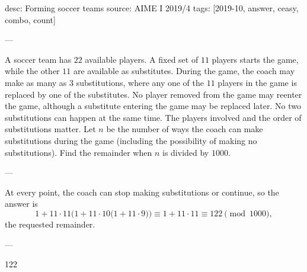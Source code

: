 desc: Forming soccer teams
source: AIME I 2019/4
tags: [2019-10, answer, ceasy, combo, count]

---

A soccer team has $22$ available players. A fixed set of $11$ players starts the game, while the other $11$ are available as substitutes. During the game, the coach may make as many as $3$ substitutions, where any one of the $11$ players in the game is replaced by one of the substitutes. No player removed from the game may reenter the game, although a substitute entering the game may be replaced later. No two substitutions can happen at the same time. The players involved and the order of substitutions matter. Let $n$ be the number of ways the coach can make substitutions during the game (including the possibility of making no substitutions). Find the remainder when $n$ is divided by $1000$.

---

At every point, the coach can stop making substitutions or continue, so the answer is \[1+11\cdot 11\Big(1+11\cdot 10\big(1+11\cdot 9\big)\Big)\equiv 1+11\cdot 11\equiv 122\pmod{1000},\]
the requested remainder.

---

122
